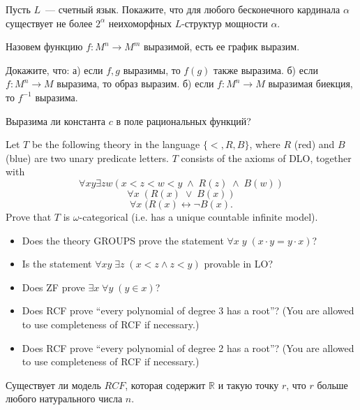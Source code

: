 \setcounter{curtask}{10}


\begin{task}
    Пусть $L$~--- счетный язык. Покажите, что для любого бесконечного кардинала
    $\alpha$ существует не более $2^{\alpha}$ неихоморфных $L$-структур мощности $\alpha$.
\end{task}

Назовем функцию $f:M^{n} \to M^{m}$ выразимой, есть ее график выразим.

\begin{task}
	Докажите, что:
    а) если $f, g$ выразимы, то $f(g)$ также выразима.
    б) если $f:M^{n} \to M$ выразима, то образ выразим.
    б) если $f:M^{n} \to M$ выразимая биекция, то $f^{-1}$ выразима.
\end{task}

\begin{task}
    Выразима ли константа $c$ в поле рациональных функций?
\end{task}

\breakline

\begin{ptask}{4}
    Let $T$ be the following theory in the language $\{<, R, B\}$, where $R$ (red) and $B$ (blue) are two unary predicate letters.
	$T$ consists of the axioms of DLO, together with 
	\[ \forall xy \exists zw (x<z<w<y \; \wedge \; R(z) \; \wedge \; B(w)) \]
	\[ \forall x \; (R(x)\; \vee \; B(x)) \]
	\[ \forall x \; (R(x) \leftrightarrow \neg B(x). \]
	Prove that $T$ is $\omega$-categorical (i.e. has a unique countable infinite model).
\end{ptask}

\begin{ptask}{8}
    \begin{itemize}
        \item Does the theory GROUPS prove the statement $\forall x\; y\;
        	(x\cdot y = y \cdot x)$?
        \item Is the statement $\forall xy\; \exists z\; (x<z \wedge z<y)$ provable
	    in LO?
    	\item Does ZF prove $\exists x \; \forall y\; (y\in x)$?
    	\item Does RCF prove ``every polynomial of degree 3 has a root''?
			(You are allowed to use completeness of RCF if necessary.)
		 \item Does RCF prove ``every polynomial of degree 2 has a root''? 
			 (You are allowed to use completeness of RCF if necessary.)
    \end{itemize}
\end{ptask}

\begin{ptask}{9}
  	Существует ли модель $RCF$, которая содержит $\mathbb{R}$ и такую точку $r$, что
    $r$ больше любого натурального числа $n$.
\end{ptask}